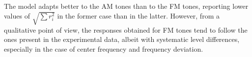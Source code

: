 \documentclass[../main.tex]{subfiles}
\begin{document}
\begin{modelchapter}
The model adapts better to the \gls{AM} tones than to the \gls{FM} tones,
reporting lower values of $\sqrt{\sum r_i^2}$ in the former case than in the
latter. However, from a qualitative point of view, the responses obtained for
\gls{FM} tones tend to follow the ones present in the experimental data, albeit
with systematic level differences, especially in the case of center frequency
and frequency deviation.

\end{modelchapter}
\end{document}
